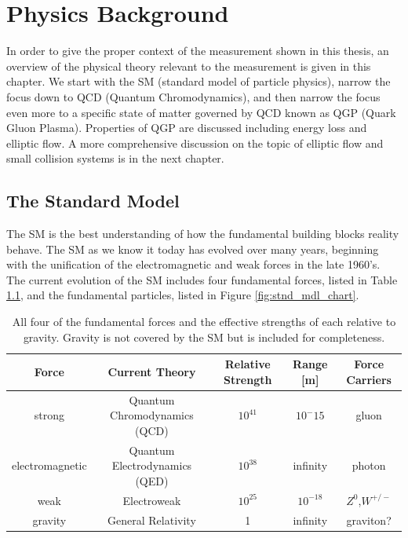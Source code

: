 \chapter{Physics Background}
In order to give the proper context of the measurement shown in this thesis,  an overview of the physical theory relevant to the measurement is given in this chapter. We start with the SM (standard model of particle physics), narrow the focus down to QCD (Quantum Chromodynamics), and then narrow the focus even more to a specific state of matter governed by QCD known as QGP (Quark Gluon Plasma). Properties of QGP are discussed including energy loss and elliptic flow. A more comprehensive discussion on the topic of elliptic flow and small collision systems is in the next chapter.
\section{The Standard Model}
The SM is the best understanding of how the fundamental building blocks reality behave. The SM as we know it today has evolved over many years, beginning with the unification of the electromagnetic and weak forces in the late 1960's. The current evolution of the SM includes four fundamental forces, listed in Table \ref{tbl:sm}, and the fundamental particles, listed in Figure \ref{fig:stnd_mdl_chart}.
\begin{table}[h!]
\caption{All four of the fundamental forces and the effective strengths of each relative to gravity. Gravity is not covered by the SM but is included for completeness.}
\begin{center}
    \begin{tabular}{ccccc}
    \hline
    Force &Current Theory  & Relative Strength & Range [m] &  Force Carriers\\ \hline
    strong  & Quantum Chromodynamics (QCD) & $10^{41}$ & $10^-{15}$&  gluon\\
    electromagnetic &Quantum Electrodynamics (QED) & $10^{38}$ & infinity &  photon\\
    weak & Electroweak & $10^{25}$ &  $10^{-18}$ & $Z^0$,$W^{+/-}$\\
    gravity & General Relativity & 1 & infinity & graviton?\\ \hline
    \end{tabular}
\end{center}
\label{tbl:sm}
\end{table}

